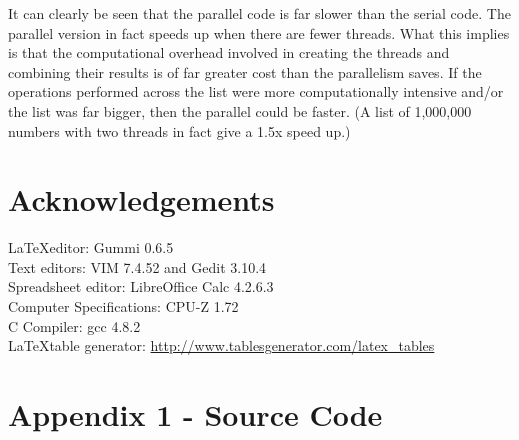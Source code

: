 \documentclass[11pt]{article}
\begin{document}
It can clearly be seen that the parallel code is far slower than the serial code. The parallel version in fact speeds up when there are fewer threads. What this implies is that the computational overhead involved in creating the threads and combining their results is of far greater cost than the parallelism saves. If the operations performed across the list were more computationally intensive and/or the list was far bigger, then the parallel could be faster. (A list of 1,000,000 numbers with two threads in fact give a 1.5x speed up.)



\section{Acknowledgements}
\LaTeX \space editor: Gummi 0.6.5
\\
Text editors: VIM 7.4.52 and Gedit 3.10.4
\\
Spreadsheet editor: LibreOffice Calc 4.2.6.3
\\
Computer Specifications: CPU-Z 1.72
\\
C Compiler: gcc 4.8.2
\\
\LaTeX \space table generator: \url{ http://www.tablesgenerator.com/latex_tables}

\newpage

\section{Appendix 1 - Source Code}

%
\end{document}
